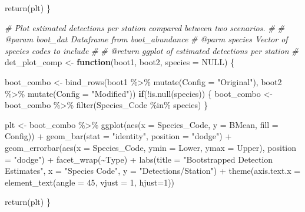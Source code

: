 \documentclass[
]{article}
\newenvironment{Shaded}{\begin{snugshade}}{\end{snugshade}}
\newcommand{\AttributeTok}[1]{\textcolor[rgb]{0.77,0.63,0.00}{#1}}
\newcommand{\CommentTok}[1]{\textcolor[rgb]{0.56,0.35,0.01}{\textit{#1}}}
\newcommand{\ConstantTok}[1]{\textcolor[rgb]{0.00,0.00,0.00}{#1}}
\newcommand{\ControlFlowTok}[1]{\textcolor[rgb]{0.13,0.29,0.53}{\textbf{#1}}}
\newcommand{\DecValTok}[1]{\textcolor[rgb]{0.00,0.00,0.81}{#1}}
\newcommand{\FunctionTok}[1]{\textcolor[rgb]{0.00,0.00,0.00}{#1}}
\newcommand{\NormalTok}[1]{#1}
\newcommand{\OtherTok}[1]{\textcolor[rgb]{0.56,0.35,0.01}{#1}}
\newcommand{\SpecialCharTok}[1]{\textcolor[rgb]{0.00,0.00,0.00}{#1}}
\newcommand{\StringTok}[1]{\textcolor[rgb]{0.31,0.60,0.02}{#1}}
\begin{document}
\begin{Shaded}
\begin{Highlighting}[]
  \FunctionTok{return}\NormalTok{(plt)}
\NormalTok{\}}

\CommentTok{\# Plot estimated detections per station compared between two scenarios.}
\CommentTok{\# }
\CommentTok{\# @param boot\_dat Dataframe from boot\_abundance}
\CommentTok{\# @parm species Vector of species codes to include}
\CommentTok{\#}
\CommentTok{\# @return ggplot of estimated detections per station}
\CommentTok{\#}
\NormalTok{det\_plot\_comp }\OtherTok{\textless{}{-}} \ControlFlowTok{function}\NormalTok{(boot1, boot2, }\AttributeTok{species =} \ConstantTok{NULL}\NormalTok{) \{}
  
\NormalTok{  boot\_combo }\OtherTok{\textless{}{-}} \FunctionTok{bind\_rows}\NormalTok{(boot1 }\SpecialCharTok{\%\textgreater{}\%}
                            \FunctionTok{mutate}\NormalTok{(}\AttributeTok{Config =} \StringTok{"Original"}\NormalTok{),}
\NormalTok{                          boot2 }\SpecialCharTok{\%\textgreater{}\%}
                            \FunctionTok{mutate}\NormalTok{(}\AttributeTok{Config =} \StringTok{"Modified"}\NormalTok{))}
  \ControlFlowTok{if}\NormalTok{(}\SpecialCharTok{!}\FunctionTok{is.null}\NormalTok{(species)) \{}
\NormalTok{    boot\_combo }\OtherTok{\textless{}{-}}\NormalTok{ boot\_combo }\SpecialCharTok{\%\textgreater{}\%}
                    \FunctionTok{filter}\NormalTok{(Species\_Code }\SpecialCharTok{\%in\%}\NormalTok{ species)}
\NormalTok{  \}}
  
\NormalTok{  plt }\OtherTok{\textless{}{-}}\NormalTok{ boot\_combo }\SpecialCharTok{\%\textgreater{}\%}
          \FunctionTok{ggplot}\NormalTok{(}\FunctionTok{aes}\NormalTok{(}\AttributeTok{x =}\NormalTok{ Species\_Code, }\AttributeTok{y =}\NormalTok{ BMean, }\AttributeTok{fill =}\NormalTok{ Config)) }\SpecialCharTok{+}
          \FunctionTok{geom\_bar}\NormalTok{(}\AttributeTok{stat =} \StringTok{"identity"}\NormalTok{, }\AttributeTok{position =} \StringTok{"dodge"}\NormalTok{) }\SpecialCharTok{+}
          \FunctionTok{geom\_errorbar}\NormalTok{(}\FunctionTok{aes}\NormalTok{(}\AttributeTok{x =}\NormalTok{ Species\_Code, }\AttributeTok{ymin =}\NormalTok{ Lower, }\AttributeTok{ymax =}\NormalTok{ Upper), }\AttributeTok{position =} \StringTok{"dodge"}\NormalTok{) }\SpecialCharTok{+}
          \FunctionTok{facet\_wrap}\NormalTok{(}\SpecialCharTok{\textasciitilde{}}\NormalTok{Type) }\SpecialCharTok{+}
          \FunctionTok{labs}\NormalTok{(}\AttributeTok{title =} \StringTok{"Bootstrapped Detection Estimates"}\NormalTok{,}
               \AttributeTok{x =} \StringTok{"Species Code"}\NormalTok{,}
               \AttributeTok{y =} \StringTok{"Detections/Station"}\NormalTok{) }\SpecialCharTok{+}
          \FunctionTok{theme}\NormalTok{(}\AttributeTok{axis.text.x =} \FunctionTok{element\_text}\NormalTok{(}\AttributeTok{angle =} \DecValTok{45}\NormalTok{, }\AttributeTok{vjust =} \DecValTok{1}\NormalTok{, }\AttributeTok{hjust=}\DecValTok{1}\NormalTok{)) }
  
  \FunctionTok{return}\NormalTok{(plt)}
\NormalTok{\}}
\end{Highlighting}
\end{Shaded}
\end{document}
